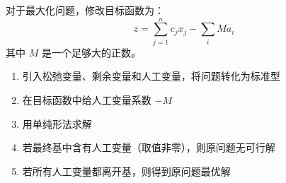 \begin{definition}[大M法的目标函数]
对于最大化问题，修改目标函数为：
\[
z = \sum_{j=1}^n c_j x_j - \sum_{i} M a_i
\]
其中 $M$ 是一个足够大的正数。
\end{definition}

\begin{algobox}[大M法算法]
\begin{enumerate}
    \item 引入松弛变量、剩余变量和人工变量，将问题转化为标准型
    \item 在目标函数中给人工变量系数 $-M$
    \item 用单纯形法求解
    \item 若最终基中含有人工变量（取值非零），则原问题无可行解
    \item 若所有人工变量都离开基，则得到原问题最优解
\end{enumerate}
\end{algobox}

